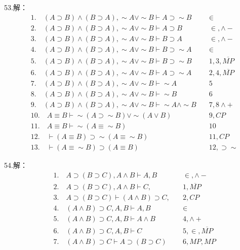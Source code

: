 \documentclass[a4paper]{ctexart}
\begin{document}
\noindent 53.解：
\begin{align*}
  &1. \quad (A\supset B)\wedge(B\supset A),\sim A\vee \sim B \vdash A\supset \sim B &\quad \in \\
  &2. \quad (A\supset B)\wedge(B\supset A),\sim A\vee \sim B \vdash A\supset B &\quad \in,\wedge- \\
  &3. \quad (A\supset B)\wedge(B\supset A),\sim A\vee \sim B \vdash B\supset A &\quad \in,\wedge- \\
  &4. \quad (A\supset B)\wedge(B\supset A),\sim A\vee \sim B \vdash B\supset \sim A &\quad \in \\
  &5. \quad (A\supset B)\wedge(B\supset A),\sim A\vee \sim B \vdash B\supset \sim B &\quad 1,3,\overline{MP} \\
  &6. \quad (A\supset B)\wedge(B\supset A),\sim A\vee \sim B \vdash A\supset \sim A &\quad 2,4,\overline{MP} \\
  &7. \quad (A\supset B)\wedge(B\supset A),\sim A\vee \sim B \vdash \sim A &\quad 5 \\
  &8. \quad (A\supset B)\wedge(B\supset A),\sim A\vee \sim B \vdash \sim B &\quad 6 \\
  &9. \quad (A\supset B)\wedge(B\supset A),\sim A\vee \sim B \vdash \sim A\wedge \sim B &\quad 7,8\wedge+ \\
  &10.\quad A\equiv B \vdash \sim(A\supset \sim B)\vee \sim(A\vee B) &\quad 9,CP\\
  &11.\quad A\equiv B \vdash \sim(A\equiv \sim B) &\quad 10\\
  &12.\quad \vdash (A\equiv B)\supset \sim(A\equiv \sim B) &\quad 11,CP\\
  &13.\quad \vdash (A\equiv \sim B)\supset (A\equiv B) &\quad 12,\supset\sim
\end{align*}

\noindent 54.解：
\begin{align*}
  &1.\quad A\supset(B\supset C), A\wedge B \vdash A,B &\quad \in,\wedge- \\
  &2.\quad A\supset(B\supset C), A\wedge B \vdash C, &\quad 1,\overline{MP} \\
  &3.\quad A\supset(B\supset C) \vdash (A\wedge B)\supset C, &\quad 2,CP \\
  &4.\quad (A\wedge B)\supset C,A,B \vdash A,B &\quad \in \\
  &5.\quad (A\wedge B)\supset C,A,B \vdash A\wedge B &\quad4, \wedge+ \\
  &6.\quad (A\wedge B)\supset C,A,B \vdash C &\quad5,\in,\overline{MP} \\
  &7.\quad (A\wedge B)\supset C \vdash A\supset(B\supset C) &\quad 6,MP,MP \\  
\end{align*}
\end{document}
